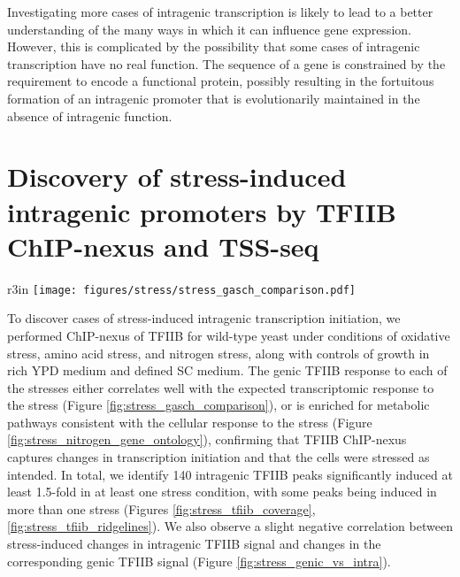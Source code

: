 Investigating more cases of intragenic transcription is likely to lead to a better understanding of the many ways in which it can influence gene expression.
However, this is complicated by the possibility that some cases of intragenic transcription have no real function.
The sequence of a gene is constrained by the requirement to encode a functional protein, possibly resulting in the fortuitous formation of an intragenic promoter that is evolutionarily maintained in the absence of intragenic function.


\clearpage

\section{Discovery of stress-induced intragenic promoters by TFIIB ChIP-nexus and TSS-seq}

\begin{wrapfigure}[20]{r}{3in}
    \centering
    \texttt{[image: figures/stress/stress\_gasch\_comparison.pdf]}
    \caption[Scatterplots comparing change in genic TFIIB signal to change in RNA microarray signal, for oxidative and amino acid stresses.]{Scatterplots comparing change in genic TFIIB signal to change in RNA microarray signal from \citet{gasch2000}, for oxidative and amino acid stresses. The Pearson correlation coefficient is shown for each comparison.}
    \label{fig:stress_gasch_comparison}
\end{wrapfigure}

To discover cases of stress-induced intragenic transcription initiation, we performed ChIP-nexus of TFIIB for wild-type yeast under conditions of oxidative stress, amino acid stress, and nitrogen stress, along with controls of growth in rich YPD medium and defined SC medium.
The genic TFIIB response to each of the stresses either correlates well with the expected transcriptomic response to the stress (Figure \ref{fig:stress_gasch_comparison}), or is enriched for metabolic pathways consistent with the cellular response to the stress (Figure \ref{fig:stress_nitrogen_gene_ontology}), confirming that TFIIB ChIP-nexus captures changes in transcription initiation and that the cells were stressed as intended.
In total, we identify 140 intragenic TFIIB peaks significantly induced at least 1.5-fold in at least one stress condition, with some peaks being induced in more than one stress (Figures \ref{fig:stress_tfiib_coverage}, \ref{fig:stress_tfiib_ridgelines}).
We also observe a slight negative correlation between stress-induced changes in intragenic TFIIB signal and changes in the corresponding genic TFIIB signal (Figure \ref{fig:stress_genic_vs_intra}).

